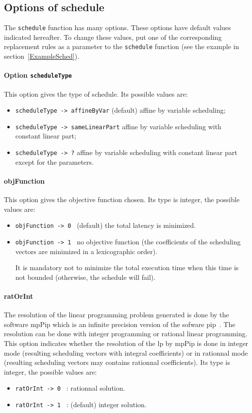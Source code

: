 \subsection{Options of schedule}
The \texttt{schedule} function has many options. These options
have default values indicated hereafter. To change these
values, put one of the corresponding replacement
rules as a parameter to the
\texttt{schedule} function (see the example in section~\ref{ExampleSched}).

\paragraph{Option \texttt{scheduleType}}
\label{schedType}
This option gives the type of schedule.
Its possible values are:
\begin{itemize}
\item \texttt{scheduleType -> affineByVar} (default) 
affine by variable scheduling;
\item \texttt{scheduleType -> sameLinearPart} affine by variable scheduling with constant linear part;
\item \texttt{scheduleType -> ?}  affine by variable scheduling with constant linear part except for the parameters.
\end{itemize}

\paragraph{objFunction }
This option gives the objective function chosen. Its type is integer,
the possible values are:
\begin{itemize}
\item \texttt{objFunction -> 0 } (default) the total latency is minimized. 
\item \texttt{objFunction -> 1 } no objective function (the
coefficients of the scheduling vectors are minimized in a
lexicographic order).

It is mandatory not to minimize the total execution time when this 
time is not bounded (otherwise, the schedule will fail).
\end{itemize}

\paragraph{ratOrInt}
The resolution of the linear programming problem generated is done 
by the software {\sc mp}Pip which is an infinite precision version
 of the sofware {\sc pip}~\cite{Feautrier88a}. The resolution can be done with
integer programming or rational linear programming.
  This option indicates whether the resolution of the {\sc lp} by {\sc mp}Pip
 is
 done in integer mode (resulting scheduling vectors with integral
 coefficients) or in rationnal mode (resulting scheduling vectors may contains
 rationnal coefficients).  Its type is integer, the possible values
 are:
\begin{itemize}
\item \texttt{ratOrInt -> 0 } : rationnal solution.
\item \texttt{ratOrInt ->  1 } : (default) integer solution.
\end{itemize}

